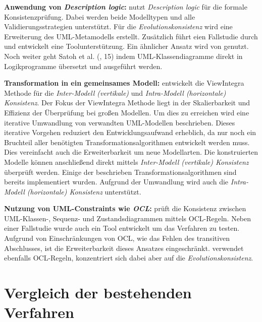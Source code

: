 \textbf{Anwendung von \emph{Description logic}:}
\cite{Mens2005} nutzt \emph{Description logic} für die formale Konsistenzprüfung.
Dabei werden beide Modelltypen und alle Validierungsstrategien unterstützt.
Für die \emph{Evolutionskonsistenz} wird eine Erweiterung des UML-Metamodells erstellt.
Zusätzlich führt \cite{Mens2005} eien Fallstudie durch und entwickelt eine Toolunterstützung.
Ein ähnlicher Ansatz wird von \cite{Simmonds2004} genutzt.
Noch weiter geht Satoh et al. (\cite{Usman2008}, 15) indem UML-Klassendiagramme direkt in Logikprogramme übersetzt und ausgeführt werden.

\textbf{Transformation in ein gemeinsames Modell:}
\cite{Egyed2001} entwickelt die ViewIntegra Methode für die  \emph{Inter-Modell (vertikale)} und \emph{Intra-Modell (horizontale) Konsistenz}.
Der Fokus der ViewIntegra Methode liegt in der Skalierbarkeit und Effizienz der Überprüfung bei großen Modellen.
Um dies zu erreichen wird eine iterative Umwandlung von verwandten UML-Modellen beschrieben.
Dieses iterative Vorgehen reduziert den Entwicklungsaufwand erheblich, da nur noch ein Bruchteil aller benötigten Transformationsalgorithmen entwickelt werden muss.
Dies vereinfacht auch die Erweiterbarkeit um neue Modellarten.
Die konstruierten Modelle können anschließend direkt mittels \emph{Inter-Modell (vertikale) Konsistenz} überprüft werden.
Einige der beschrieben Transformationsalgorithmen sind bereits implementiert wurden.
Aufgrund der Umwandlung wird auch die \emph{Intra-Modell (horizontale) Konsistenz} unterstützt.

\textbf{Nutzung von UML-Constraints wie \emph{OCL}:}
\cite{Egyed2006} prüft die Konsistenz zwischen UML-Klassen-, Sequenz- und Zustandsdiagrammen mittels OCL-Regeln.
Neben einer Fallstudie wurde auch ein Tool entwickelt um das Verfahren zu testen.
Aufgrund von Einschränkungen von OCL, wie das Fehlen des transitiven Abschlusses, ist die Erweiterbarkeit dieses Ansatzes eingeschränkt.
\cite{Briand2003} verwendet ebenfalls OCL-Regeln, konzentriert sich dabei aber auf die \emph{Evolutionskonsistenz}.

\section{Vergleich der bestehenden Verfahren}

